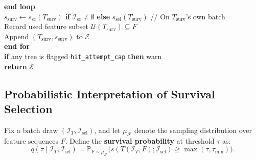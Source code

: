 \documentclass[11pt,a4paper]{article}
\newcommand{\code}[1]{\texttt{#1}}
\newcommand{\algkw}[1]{\textbf{#1}}
\newcommand{\algcm}[1]{\quad\textcolor{MutedGray}{\footnotesize // #1}}
\newcommand{\Prob}{\mathbb{P}}
\begin{document}
\begin{algorithm}[htbp]
\begin{tabbing}
    \> \algkw{end loop} \\[2pt]
    \> $s_{\text{surv}} \gets s_{\text{sc}}(T_{\text{surv}})$ \algkw{if} $\mathcal{I}_{\text{sc}} \neq \emptyset$ \algkw{else} $s_{\text{sel}}(T_{\text{surv}})$ \algcm{On $T_{\text{surv}}$'s own batch} \\
    \> Record used feature subset $\mathcal{U}(T_{\text{surv}}) \subseteq F$ \\
    \> Append $(T_{\text{surv}}, s_{\text{surv}})$ to $\mathcal{E}$ \\
    \algkw{end for} \\
    \algkw{if} any tree is flagged \code{hit\_attempt\_cap} \algkw{then} warn \\
    \algkw{return} $\mathcal{E}$
  \end{tabbing}
\end{algorithm}

\subsection{Probabilistic Interpretation of Survival Selection}

Fix a batch draw $(\mathcal{I}_T, \mathcal{I}_{\text{sel}})$, and let $\mu_{\mathcal{F}}$ denote the sampling distribution over feature sequences $F$. Define the \textbf{survival probability} at threshold $\tau$ as:
\begin{equation}
  q(\tau \mid \mathcal{I}_{T}, \mathcal{I}_{\text{sel}})
  = \Prob_{F \sim \mu_{\mathcal{F}}}\!\big(s(T(\mathcal{I}_{T}, F); \mathcal{I}_{\text{sel}}) \ge \max(\tau, \tau_{\min})\big).
\end{equation}
\end{document}
